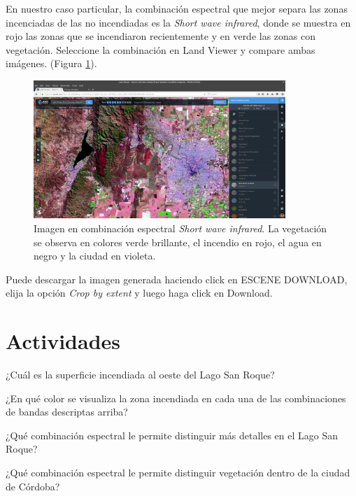 \documentclass[a4paper,12pt]{book}
\begin{document}
En nuestro caso particular, la combinación espectral que mejor separa las zonas incenciadas de las no incendiadas es la \emph{Short wave infrared}, donde se muestra en rojo las zonas que se incendiaron recientemente y en verde las zonas con vegetación. Seleccione la combinación en Land Viewer y compare ambas imágenes. (Figura \ref{fig:incendio}).

\begin{figure}[h!]
    \centering
    \includegraphics[width=0.85\textwidth]{fig:incendio.png}
    \caption{Imagen en combinación espectral \emph{Short wave infrared}. La vegetación se observa en colores verde brillante, el incendio en rojo, el agua en negro y la ciudad en violeta.}
    \label{fig:incendio}
\end{figure}

Puede descargar la imagen generada haciendo click en ESCENE DOWNLOAD, elija la opción  \emph{Crop by extent} y luego haga click en Download.

\section{Actividades}

\begin{que}
    ¿Cuál es la superficie incendiada al oeste del Lago San Roque?
\end{que}

\begin{que}
    ¿En qué color se visualiza la zona incendiada en cada una de las combinaciones de bandas descriptas arriba?
\end{que}

\begin{que}
    ¿Qué combinación espectral le permite distinguir más detalles en el Lago San Roque?
\end{que}

\begin{que}
    ¿Qué combinación espectral le permite distinguir vegetación dentro de la ciudad de Córdoba?
\end{que}
\end{document}

